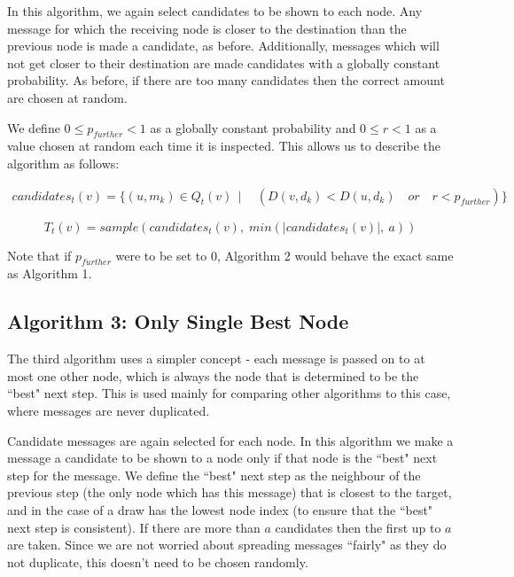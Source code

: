 \documentclass[bsc,frontabs,twoside,singlespacing,parskip,deptreport]{infthesis}     %
\begin{document}
In this algorithm, we again select candidates to be shown to each node. Any message for which the receiving node is closer to the destination than the previous node is made a candidate, as before. Additionally, messages which will not get closer to their destination are made candidates with a globally constant probability. As before, if there are too many candidates then the correct amount are chosen at random.

We define $0 \leq p_{further} < 1$ as a globally constant probability and $0 \leq r < 1$ as a value chosen at random each time it is inspected. This allows us to describe the algorithm as follows:

\begin{equation}
\begin{split}
candidates_{t}(v) = \{ (u, m_{k}) \in Q_{t}(v) \:\: | \:\: & (D(v, d_{k}) < D(u, d_{k}) \quad or \quad r < p_{further}) \}
\end{split}
\end{equation}

\begin{equation}
T_{t}(v) = sample(candidates_{t}(v), \; min(|candidates_{t}(v)|, \: a))
\end{equation}

Note that if $p_{further}$ were to be set to 0, Algorithm 2 would behave the exact same as Algorithm 1.

\subsection{Algorithm 3: Only Single Best Node}
The third algorithm uses a simpler concept - each message is passed on to at most one other node, which is always the node that is determined to be the ``best" next step. This is used mainly for comparing other algorithms to this case, where messages are never duplicated.

Candidate messages are again selected for each node. In this algorithm we make a message a candidate to be shown to a node only if that node is the ``best" next step for the message. We define the ``best" next step as the neighbour of the previous step (the only node which has this message) that is closest to the target, and in the case of a draw has the lowest node index (to ensure that the ``best" next step is consistent). If there are more than $a$ candidates then the first up to $a$ are taken. Since we are not worried about spreading messages ``fairly" as they do not duplicate, this doesn't need to be chosen randomly. 
\end{document}
